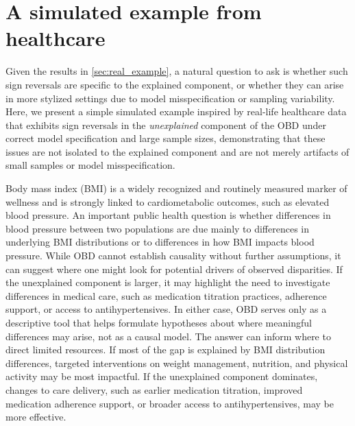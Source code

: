 \section{A simulated example from healthcare}
\label{sec:example}

Given the results in \cref{sec:real_example}, a natural question to ask is whether such sign reversals are specific to the explained component, or whether they can arise in more stylized settings due to model misspecification or sampling variability. Here, we present a simple simulated example inspired by real-life healthcare data that exhibits sign reversals in the \emph{unexplained} component of the OBD under correct model specification and large sample sizes, demonstrating that these issues are not isolated to the explained component and are not merely artifacts of small samples or model misspecification.


Body mass index (BMI) is a widely recognized and routinely measured marker of wellness \cite{heymsfield2016} and is strongly linked to cardiometabolic outcomes, such as elevated blood pressure. 
An important public health question is whether differences in blood pressure between two populations are due mainly to differences in underlying BMI distributions or to differences in how BMI impacts blood pressure. While OBD cannot establish causality without further assumptions, it can suggest where one might look for potential drivers of observed disparities.
If the unexplained component is larger, it may highlight the need to investigate differences in medical care, such as medication titration practices, adherence support, or access to antihypertensives. 
In either case, OBD serves only as a descriptive tool that helps formulate hypotheses about where meaningful differences may arise, not as a causal model.
The answer can inform where to direct limited resources. 
If most of the gap is explained by BMI distribution differences, targeted interventions on weight management, nutrition, and physical activity may be most impactful. 
If the unexplained component dominates, changes to care delivery, such as earlier medication titration, improved medication adherence support, or broader access to antihypertensives, may be more effective. 

